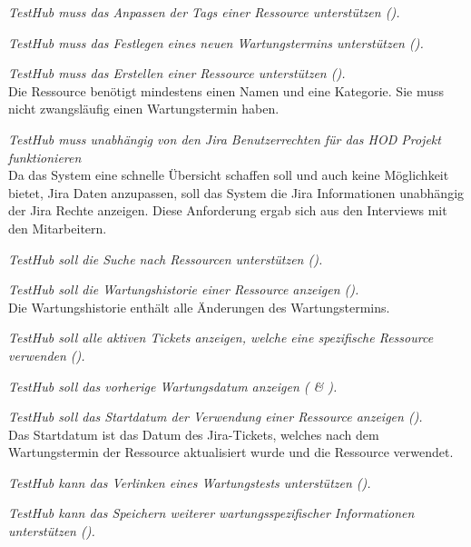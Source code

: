 \begin{description}
    \textit{TestHub muss das Anpassen der Tags einer Ressource unterstützen 
    ().}

    \textit{TestHub muss das Festlegen eines neuen Wartungstermins unterstützen 
    ().}

    \textit{TestHub muss das Erstellen einer Ressource unterstützen 
    ().}\\
    Die Ressource benötigt mindestens einen Namen und eine Kategorie. Sie muss 
    nicht zwangsläufig einen Wartungstermin haben.

    \textit{TestHub muss unabhängig von den \gls{Jira} Benutzerrechten für das HOD Projekt funktionieren}\\
    Da das System eine schnelle Übersicht schaffen soll und auch keine Möglichkeit
    bietet, \gls{Jira} Daten anzupassen, soll das System die \gls{Jira} 
    Informationen unabhängig der \gls{Jira} Rechte anzeigen.
    Diese Anforderung ergab sich aus den Interviews mit den Mitarbeitern.



    \textit{TestHub soll die Suche nach Ressourcen unterstützen ().}

    \textit{TestHub soll die Wartungshistorie einer Ressource anzeigen ().}\\
    Die Wartungshistorie enthält alle Änderungen des Wartungstermins.

    \textit{TestHub soll alle aktiven Tickets anzeigen, welche eine spezifische 
    Ressource verwenden ().}

    \textit{TestHub soll das vorherige Wartungsdatum anzeigen ( \& ).}
    
    \textit{TestHub soll das Startdatum der Verwendung einer Ressource anzeigen ().}\\
    Das Startdatum ist das Datum des Jira-Tickets, welches nach dem Wartungstermin 
    der Ressource aktualisiert wurde und die Ressource verwendet.


    \textit{TestHub kann das Verlinken eines Wartungstests unterstützen 
    ().}

    \textit{TestHub kann das Speichern weiterer wartungsspezifischer Informationen unterstützen 
    ().}

\end{description}

